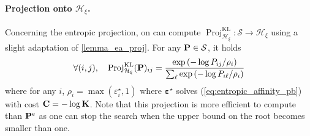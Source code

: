 \paragraph{Projection onto $\mathcal{H}_{\xi}$.}
Concerning the entropic projection, on can compute $\operatorname{Proj}^{\operatorname{KL}}_{\mathcal{H}_{\xi}} \colon \mathcal{S} \to \mathcal{H}_\xi$ using a slight adaptation of \cref{lemma_ea_proj}. For any $\mathbf{P} \in \mathcal{S}$, it holds
\begin{align}
  \forall (i,j), \quad \operatorname{Proj}^{\operatorname{KL}}_{\mathcal{H}_{\xi}}(\mathbf{P})_{ij} =  \frac{\exp{(-\log P_{ij}/\rho_i)}}{\sum_\ell \exp{(- \log P_{i\ell}/\rho_i)}}
\end{align}
where for any $i$, $\rho_i = \max(\varepsilon^\star_i, 1)$ where $\bm{\varepsilon}^\star$ solves (\ref{eq:entropic_affinity_pb}) with cost $\mathbf{C} = -\log \mathbf{K}$. Note that this projection is more efficient to compute than $\mathbf{P}^{\mathrm{e}}$ as one can stop the search when the upper bound on the root becomes smaller than one. 



